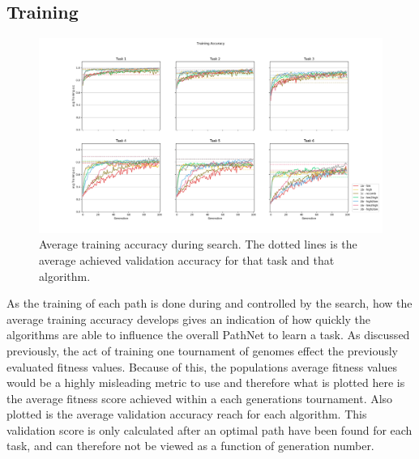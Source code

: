 \subsection{Training}
\begin{figure}[p!]%
    \includegraphics[width=\textwidth]{Chapters/Experiments/search_algo/figures/Training_accuracy.png}
    \caption{Average training accuracy during search. The dotted lines is the average achieved validation accuracy for that task and that algorithm.}
    \label{fig:search.accuracy}
\end{figure}
As the training of each path is done during and controlled by the search, how the average training accuracy develops gives an indication of how quickly the algorithms are able to influence the overall PathNet to learn a task. As discussed previously, the act of training one tournament of genomes effect the previously evaluated fitness values. Because of this, the populations average fitness values would be a highly misleading metric to use and therefore what is plotted here is the average fitness score achieved within a each generations tournament. Also plotted is the average validation accuracy reach for each algorithm. This validation score is only calculated after an optimal path have been found for each task, and can therefore not be viewed as a function of generation number. 

